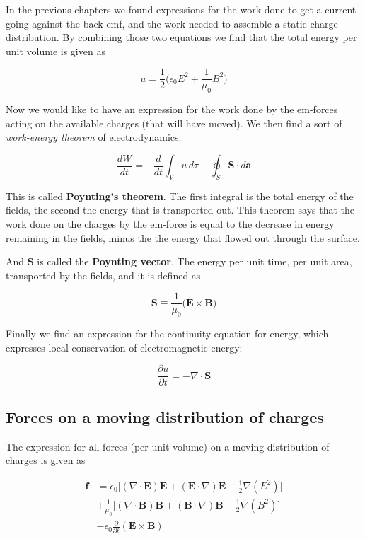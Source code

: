 \documentclass[a4paper]{article}
\begin{document}
In the previous chapters we found expressions for the work done to get a current going against the back emf, and the work needed to assemble a static charge distribution. By combining those two equations we find that the total energy per unit volume is given as

\begin{equation}
    u=\frac{1}{2}\bigg(\epsilon_0E^2+\frac{1}{\mu_0}B^2\bigg)
\end{equation}

Now we would like to have an expression for the work done by the em-forces acting on the available charges (that will have moved). We then find a sort of \textit{work-energy theorem} of electrodynamics:

\begin{equation}
    \frac{dW}{dt}=-\frac{d}{dt}\int_V u\,d\tau - \oint_S \bm{S}\cdot d\bm{a}
\end{equation}

This is called \textbf{Poynting's theorem}. The first integral is the total energy of the fields, the second the energy that is transported out. This theorem says that the work done on the charges by the em-force is equal to the decrease in energy remaining in the fields, minus the the energy that flowed out through the surface. 

\bigskip

And $\bm{S}$ is called the \textbf{Poynting vector}. The energy per unit time, per unit area, transported by the fields, and it is defined as

\begin{equation}
    \bm{S}\equiv \frac{1}{\mu_0}\big(\bm{E}\times\bm{B}\big)
\end{equation}

Finally we find an expression for the continuity equation for energy, which expresses local conservation of electromagnetic energy:

\begin{equation}
    \frac{\partial u}{\partial t}=-\nabla\cdot\bm{S}
\end{equation}

\subsection{Forces on a moving distribution of charges}

The expression for all forces (per unit volume) on a moving distribution of charges is given as

\begin{align}
    \bm{f}&=\epsilon_0\bigg[(\nabla\cdot\bm{E})\bm{E}+(\bm{E}\cdot\nabla)\bm{E}-\frac{1}{2}\nabla(E^2)\bigg] \\
          &+ \frac{1}{\mu_0}\bigg[(\nabla\cdot\bm{B})\bm{B}+(\bm{B}\cdot\nabla)\bm{B}-\frac{1}{2}\nabla(B^2)\bigg] \\
          &- \epsilon_0\frac{\partial}{\partial t}(\bm{E}\times\bm{B})
\end{align}
\end{document}
